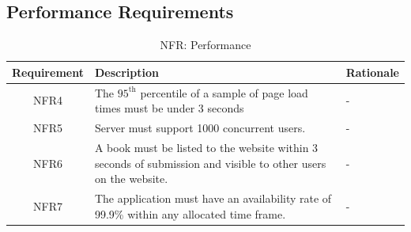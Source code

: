 \documentclass[fullpage]{article}
\begin{document}
\subsection{Performance Requirements}
\begin{table}[h]
\flushleft
\begin{tabular}{|c|p{6cm}|p{6cm}|}
\hline
 \rowcolor{lightgray} 
\textbf{Requirement} & \textbf{Description} & \textbf{Rationale} \\
\hline
NFR4 & The $95^{\text{th}}$ percentile of a sample of page load times must be under 3 seconds & -\\

% 
\hline
NFR5 &Server must support 1000 concurrent users.& - \\ %
\hline

NFR6 & A book must be listed to the website within 3 seconds of submission and visible to other users on the website.&- \\
\hline
NFR7& The application must have an availability rate of 99.9\% within any allocated time frame.&-\\
\hline
\end{tabular}
\caption{NFR: Performance}
\end{table}
\newpage
\end{document}
